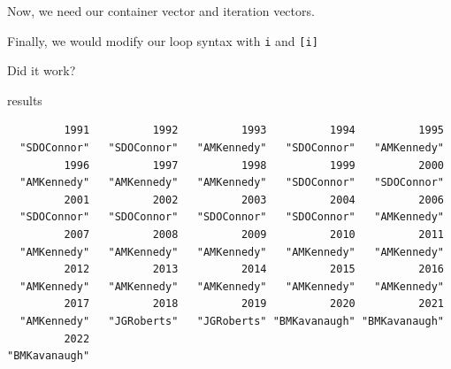 \documentclass[
  letterpaper,
  DIV=11,
  numbers=noendperiod]{scrreprt}
\newenvironment{Shaded}{\begin{snugshade}}{\end{snugshade}}
\newcommand{\ConstantTok}[1]{\textcolor[rgb]{0.56,0.35,0.01}{#1}}
\newcommand{\ControlFlowTok}[1]{\textcolor[rgb]{0.00,0.23,0.31}{#1}}
\newcommand{\DecValTok}[1]{\textcolor[rgb]{0.68,0.00,0.00}{#1}}
\newcommand{\FunctionTok}[1]{\textcolor[rgb]{0.28,0.35,0.67}{#1}}
\newcommand{\NormalTok}[1]{\textcolor[rgb]{0.00,0.23,0.31}{#1}}
\newcommand{\OtherTok}[1]{\textcolor[rgb]{0.00,0.23,0.31}{#1}}
\newcommand{\SpecialCharTok}[1]{\textcolor[rgb]{0.37,0.37,0.37}{#1}}
\begin{document}
Now, we need our container vector and iteration vectors.

\begin{Shaded}
\end{Shaded}

Finally, we would modify our loop syntax with \texttt{i} and
\texttt{{[}i{]}}

\begin{Shaded}
\end{Shaded}

Did it work?

\begin{Shaded}
\begin{Highlighting}[]
\NormalTok{results}
\end{Highlighting}
\end{Shaded}

\begin{verbatim}
         1991          1992          1993          1994          1995 
  "SDOConnor"   "SDOConnor"   "AMKennedy"   "SDOConnor"   "AMKennedy" 
         1996          1997          1998          1999          2000 
  "AMKennedy"   "AMKennedy"   "AMKennedy"   "SDOConnor"   "SDOConnor" 
         2001          2002          2003          2004          2006 
  "SDOConnor"   "SDOConnor"   "SDOConnor"   "SDOConnor"   "AMKennedy" 
         2007          2008          2009          2010          2011 
  "AMKennedy"   "AMKennedy"   "AMKennedy"   "AMKennedy"   "AMKennedy" 
         2012          2013          2014          2015          2016 
  "AMKennedy"   "AMKennedy"   "AMKennedy"   "AMKennedy"   "AMKennedy" 
         2017          2018          2019          2020          2021 
  "AMKennedy"   "JGRoberts"   "JGRoberts" "BMKavanaugh" "BMKavanaugh" 
         2022 
"BMKavanaugh" 
\end{verbatim}
\end{document}
